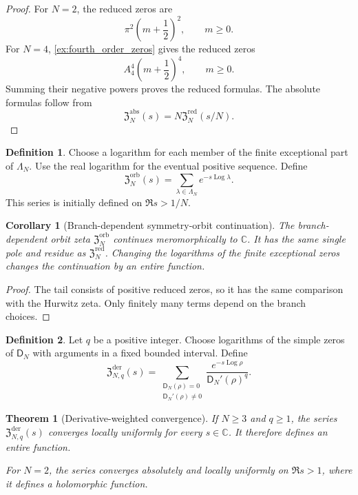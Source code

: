 \documentclass[11pt,letterpaper]{article}
\newtheorem{theorem}{Theorem}[section]
\newtheorem{corollary}[corollary]{Corollary}
\theoremstyle{definition}
\newtheorem{definition}[definition]{Definition}
\theoremstyle{remark}
\newcommand{\CC}{\mathbb C}
\newcommand{\Dfun}{\mathsf D}
\newcommand{\Log}{\operatorname{Log}}
\begin{document}
\begin{proof}
For $N=2$, the reduced zeros are
\[
\pi^2\left(m+\frac12\right)^2,
\qquad m\geq0.
\]
For $N=4$, \cref{ex:fourth_order_zeros} gives the reduced zeros
\[
A_4^4\left(m+\frac12\right)^4,
\qquad m\geq0.
\]
Summing their negative powers proves the reduced formulas.  The absolute formulas follow from
\[
\mathfrak Z_N^{\mathrm{abs}}(s)
=
N\mathfrak Z_N^{\mathrm{red}}(s/N).
\]
\end{proof}

\begin{definition}\label{def:branch_orbit_zeta}
Choose a logarithm for each member of the finite exceptional part of $\Lambda_N$.  Use the real logarithm for the eventual positive sequence.  Define
\[
\mathfrak Z_N^{\mathrm{orb}}(s)
=
\sum_{\lambda\in\Lambda_N}e^{-s\Log\lambda}.
\]
This series is initially defined on $\Re s>1/N$.
\end{definition}

\begin{corollary}[Branch-dependent symmetry-orbit continuation]\label{cor:branch_grouped_continuation}
The branch-dependent orbit zeta $\mathfrak Z_N^{\mathrm{orb}}$ continues meromorphically to $\CC$.  It has the same single pole and residue as $\mathfrak Z_N^{\mathrm{red}}$.  Changing the logarithms of the finite exceptional zeros changes the continuation by an entire function.
\end{corollary}

\begin{proof}
The tail consists of positive reduced zeros, so it has the same comparison with the Hurwitz zeta.  Only finitely many terms depend on the branch choices.
\end{proof}

\begin{definition}\label{def:derivative_weighted_zeta}
Let $q$ be a positive integer.  Choose logarithms of the simple zeros of $\Dfun_N$ with arguments in a fixed bounded interval.  Define
\[
\mathfrak Z_{N,q}^{\mathrm{der}}(s)
=
\sum_{\substack{\Dfun_N(\rho)=0\\ \Dfun_N'(\rho)\ne0}}
\frac{e^{-s\Log\rho}}{\Dfun_N'(\rho)^q}.
\]
\end{definition}

\begin{theorem}[Derivative-weighted convergence]\label{thm:derivative_weighted_convergence}
If $N\geq3$ and $q\geq1$, the series $\mathfrak Z_{N,q}^{\mathrm{der}}(s)$ converges locally uniformly for every $s\in\CC$.  It therefore defines an entire function.

For $N=2$, the series converges absolutely and locally uniformly on
$\Re s>1$, where it defines a holomorphic function.
\end{theorem}
\end{document}
